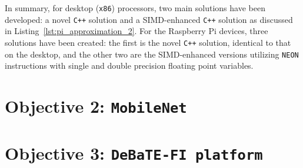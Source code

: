 In summary, for desktop (\texttt{x86}) processors, two main solutions have been developed: a novel \texttt{C++} solution and a SIMD-enhanced \texttt{C++} solution as discussed in Listing~\ref{lst:pi_approximation_2}. For the Raspberry Pi devices, three solutions have been created: the first is the novel \texttt{C++} solution, identical to that on the desktop, and the other two are the SIMD-enhanced versions utilizing \texttt{NEON} instructions with single and double precision floating point variables.

\section{Objective 2: \texttt{MobileNet}}


\section{Objective 3: \texttt{DeBaTE-FI platform}}